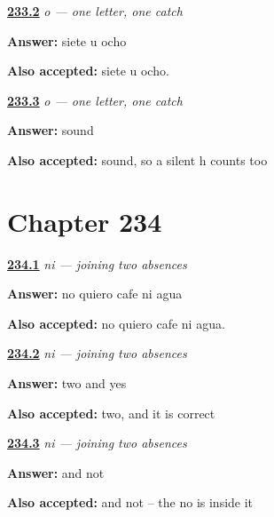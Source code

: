 \noindent\begin{minipage}[t]{\linewidth}
\raggedright
\hyperlink{review-ES-C61-o-swap}{\textbf{233.2}} \emph{o — one letter, one catch}\par
\small \textbf{Answer:} siete u ocho\par
\footnotesize \textbf{Also accepted:} siete u ocho.
\end{minipage}\par\medskip

\noindent\begin{minipage}[t]{\linewidth}
\raggedright
\hyperlink{review-ES-C61-o-why}{\textbf{233.3}} \emph{o — one letter, one catch}\par
\small \textbf{Answer:} sound\par
\footnotesize \textbf{Also accepted:} sound, so a silent h counts too
\end{minipage}\par\medskip

\section*{Chapter 234}

\noindent\begin{minipage}[t]{\linewidth}
\raggedright
\hyperlink{review-ES-C61-ni-say}{\textbf{234.1}} \emph{ni — joining two absences}\par
\small \textbf{Answer:} no quiero cafe ni agua\par
\footnotesize \textbf{Also accepted:} no quiero cafe ni agua.
\end{minipage}\par\medskip

\noindent\begin{minipage}[t]{\linewidth}
\raggedright
\hyperlink{review-ES-C61-ni-count}{\textbf{234.2}} \emph{ni — joining two absences}\par
\small \textbf{Answer:} two and yes\par
\footnotesize \textbf{Also accepted:} two, and it is correct
\end{minipage}\par\medskip

\noindent\begin{minipage}[t]{\linewidth}
\raggedright
\hyperlink{review-ES-C61-ni-mean}{\textbf{234.3}} \emph{ni — joining two absences}\par
\small \textbf{Answer:} and not\par
\footnotesize \textbf{Also accepted:} and not -- the no is inside it
\end{minipage}\par\medskip

